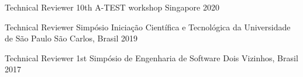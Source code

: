 \begin{cvhonors}
  \cvhonor
    {Technical Reviewer} %
    {10th A-TEST workshop} %
    {Singapore} %
    {2020} %

  \cvhonor
    {Technical Reviewer} %
    {Simpósio Iniciação Científica e Tecnológica da Universidade de São Paulo} %
    {São Carlos, Brasil} %
    {2019} %

  \cvhonor
    {Technical Reviewer} %
    {1st Simpósio de Engenharia de Software} %
    {Dois Vizinhos, Brasil} %
    {2017} %


\end{cvhonors}
